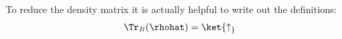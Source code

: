 To reduce the density matrix it is actually helpful to write out the definitions:
\begin{align}
\Tr_B(\rhohat) = \ket{\uparrow_}
\end{align}